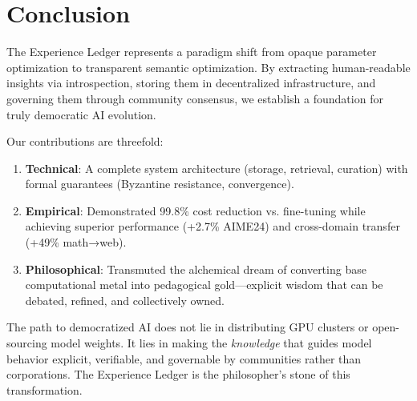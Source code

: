 \section{Conclusion}


The Experience Ledger represents a paradigm shift from opaque parameter optimization to transparent semantic optimization. By extracting human-readable insights via introspection, storing them in decentralized infrastructure, and governing them through community consensus, we establish a foundation for truly democratic AI evolution.

Our contributions are threefold:

\begin{enumerate}
    \item \textbf{Technical}: A complete system architecture (storage, retrieval, curation) with formal guarantees (Byzantine resistance, convergence).
    
    \item \textbf{Empirical}: Demonstrated 99.8\% cost reduction vs. fine-tuning while achieving superior performance (+2.7\% AIME24) and cross-domain transfer (+49\% math→web).
    
    \item \textbf{Philosophical}: Transmuted the alchemical dream of converting base computational metal into pedagogical gold—explicit wisdom that can be debated, refined, and collectively owned.
\end{enumerate}

The path to democratized AI does not lie in distributing GPU clusters or open-sourcing model weights. It lies in making the \textit{knowledge} that guides model behavior explicit, verifiable, and governable by communities rather than corporations. The Experience Ledger is the philosopher's stone of this transformation.

